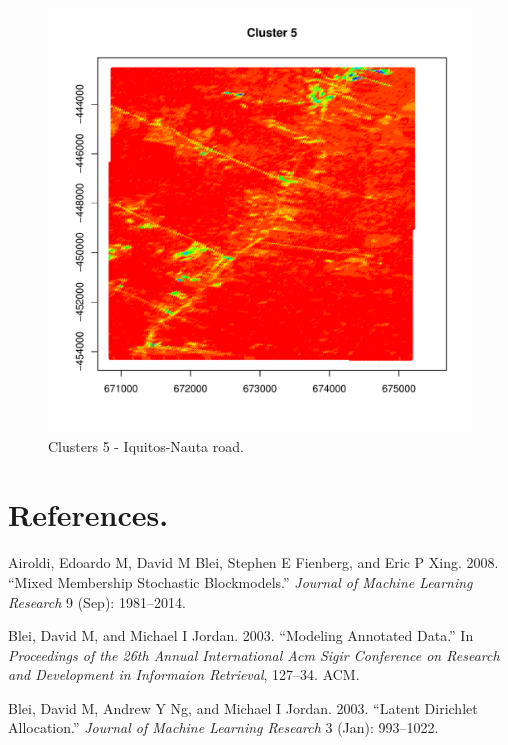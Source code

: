 \documentclass[article]{jss}
\begin{document}
\begin{figure}
    \includegraphics[width=\linewidth, height=0.85\textheight]{plot0025.pdf}
    \caption{Clusters 5 - Iquitos-Nauta road.}
    \label{figure:cluster5}
\end{figure}

\section*{References.}\label{references.}

\hypertarget{refs}{}
\hypertarget{ref-airoldi2008mixed}{}
Airoldi, Edoardo M, David M Blei, Stephen E Fienberg, and Eric P Xing.
2008. ``Mixed Membership Stochastic Blockmodels.'' \emph{Journal of
Machine Learning Research} 9 (Sep): 1981--2014.

\hypertarget{ref-blei2003modeling}{}
Blei, David M, and Michael I Jordan. 2003. ``Modeling Annotated Data.''
In \emph{Proceedings of the 26th Annual International Acm Sigir
Conference on Research and Development in Informaion Retrieval},
127--34. ACM.

\hypertarget{ref-blei2003latent}{}
Blei, David M, Andrew Y Ng, and Michael I Jordan. 2003. ``Latent
Dirichlet Allocation.'' \emph{Journal of Machine Learning Research} 3
(Jan): 993--1022.
\end{document}
